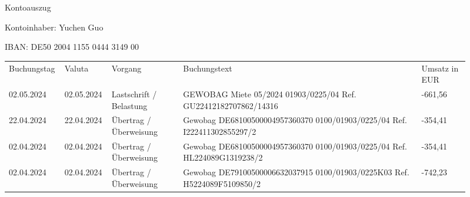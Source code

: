 \documentclass[a4paper,landscape,11pt]{article}
\begin{document}
{\Huge Kontoauszug}

Kontoinhaber: Yuchen Guo

IBAN: DE50 2004 1155 0444 3149 00

\begin{center}
  \begin{tabular}{p{0.08\linewidth} p{0.08\linewidth} p{0.15\linewidth}
    p{0.5\linewidth} p{0.1\linewidth} }
Buchungstag & Valuta & Vorgang                 & Buchungstext                                                                                                                       & Umsatz in EUR \\
02.05.2024  & 02.05.2024            & Lastschrift / Belastung & GEWOBAG Miete 05/2024 01903/0225/04 Ref. GU22412182707862/14316 & -661,56       \\
22.04.2024  & 22.04.2024            & Übertrag / Überweisung  & Gewobag DE68100500004957360370 0100/01903/0225/04 Ref. I222411302855297/2  & -354,41       \\
02.04.2024  & 02.04.2024            & Übertrag / Überweisung  &
                                                                Gewobag DE68100500004957360370 0100/01903/0225/04 Ref. HL224089G1319238/2  & -354,41         \\
02.04.2024  & 02.04.2024            & Übertrag / Überweisung  & Gewobag DE79100500006632037915 0100/01903/0225K03 Ref. H5224089F5109850/2  & -742,23 
\end{tabular}
\end{center}
\end{document}
